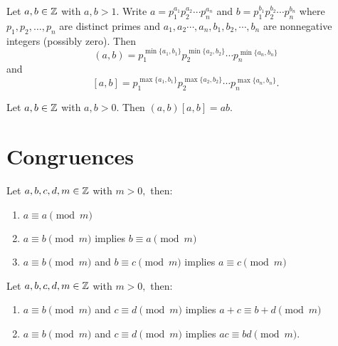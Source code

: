 \documentclass[letterpaper, 11 pt]{ximera}
\begin{document}
\begin{prop*}[Proposition 1.17]\label{prop:form-lcm-gcd}
 Let $a,b\in\mathbb Z$ with $a,b\gt 1.$ Write $a=p_1^{a_1}p_2^{a_2}\cdots  p_n^{a_n}$ and $b=p_1^{b_1}p_2^{b_2}\cdots p_n^{b_n}$ where $p_1,p_2,\dots,p_n$ are distinct primes and ${a_1},{a_2}\cdots,{a_n},{b_1},{b_2},\cdots,{b_n}$ are nonnegative integers (possibly zero). Then
        \[(a,b)=p_1^{\min\{a_1,b_1\}}p_2^{\min\{a_2,b_2\}}\cdots p_n^{\min\{a_n,b_n\}}\]
        and 
        \[[a,b]=p_1^{\max\{a_1,b_1\}}p_2^{\max\{a_2,b_2\}}\cdots p_n^{\max\{a_n,b_n\}}.\]
\end{prop*}

\begin{thm*}[Theorem 1.19]\label{thm:prod-lcm-gcd} Let $a,b\in\mathbb Z$ with $a,b\gt 0.$ Then $(a,b)[a,b]=ab.$
\end{thm*}

\section*{Congruences}

\begin{prop*}[Proposition 2.1]\label{prop:equiv-rel}
    Let $a,b,c,d,m\in\mathbb Z$ with $m>0,$ then:
        \begin{enumerate}
            \item\label{equiv-reflect} $a\equiv a \pmod{m}$
            
            \item\label{equiv-sym} $a\equiv b \pmod{m}$ implies $b\equiv a \pmod{m}$

            \item\label{equiv-trans} $a\equiv b \pmod{m}$ and $b\equiv c \pmod{m}$ implies $a\equiv c \pmod{m}$
\end{enumerate}
\end{prop*}


\begin{prop*}[Proposition 2.4]\label{prop:add-mult}
    Let $a,b,c,d,m\in\mathbb Z$ with $m>0,$ then:
    
    \begin{enumerate}[label=(\alph*)]
        \item\label{equiv-add} $a\equiv b \pmod{m}$ and $c\equiv d \pmod{m}$ implies $a+c \equiv b+d \pmod{m}$ 
        \item\label{equiv-multiply} $a\equiv b\pmod{m}$ and $c\equiv d \pmod{m}$ implies $ac\equiv bd \pmod{m}$.
    \end{enumerate}
\end{prop*}
\end{document}
